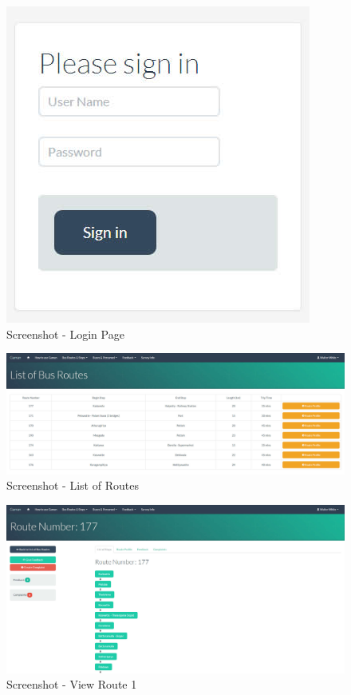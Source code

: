 \documentclass[12pt, oneside]{report}
\begin{document}
\begin {figure} [h!]
\centering
\includegraphics[scale=0.5]{loginPage}
\caption [Screenshot - Login Page] {Screenshot - Login Page}
\label {image-loginPage}
\end {figure}

\begin {figure} [h!]
\centering
\includegraphics[scale=0.2]{listRoutes}
\caption [Screenshot - List of Routes] {Screenshot - List of Routes}
\label {image-listRoutes}
\end {figure}


\begin {figure} [h!]
\centering
\includegraphics[scale=0.2]{viewRoute1}
\caption [Screenshot - View Route 1] {Screenshot - View Route 1}
\label {image-viewRoute1}
\end {figure}
\end{document}
